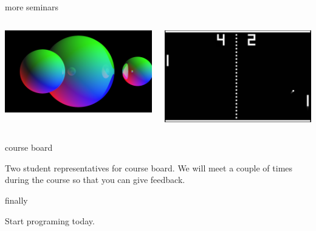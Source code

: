 \begin{frame}{more seminars}

  \begin{columns}
      \begin{column}{0.5\linewidth}
        \includegraphics[scale=0.1]{tracer.png}
      \end{column}
      \begin{column}{0.5\linewidth}      
        \includegraphics[scale=0.1]{pong.png}
      \end{column}
  \end{columns}
    
\end{frame}


\begin{frame}{course board}

  Two student representatives for course board. We will meet a couple
  of times during the course so that you can give feedback.

\end{frame}


\begin{frame}{finally}

  \pause\vspace{60pt}\hspace{40pt} Start programing today.

\end{frame}


